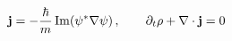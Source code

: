 \documentclass[preview]{standalone}
\begin{document}
\begin{align*}
\special{dvisvgm:raw <g id='unique000'>}\mathbf{j}=-\frac{\hbar}{m}\,\mathrm{Im}(\psi^*\nabla\psi)\,,\qquad \partial_t\rho+\nabla\cdot\mathbf{j}=0\special{dvisvgm:raw </g>}
\end{align*}
\end{document}
